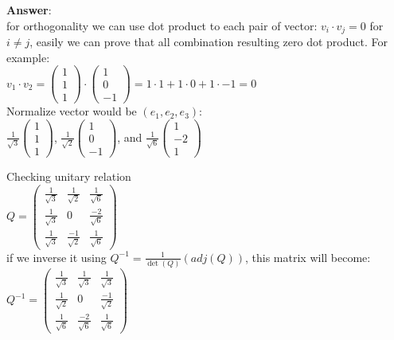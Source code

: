 \documentclass[paper=a4, fontsize=11pt]{scrartcl}
\numberwithin{equation}{section} %
\numberwithin{figure}{section} %
\numberwithin{table}{section} %
\begin{document}
\textbf{Answer}:\\
for orthogonality we can use dot product to each pair of vector:
$v_{i} \cdot v_{j} = 0$ for $i \neq j$, easily we can prove that all combination resulting zero dot product. For example:\\
$ v_1 \cdot v_2 = \begin{pmatrix} 1 \\ 1 \\ 1 \end{pmatrix} \cdot \begin{pmatrix} 1 \\ 0 \\ -1 \end{pmatrix} = 1\cdot 1 + 1 \cdot 0 + 1 \cdot -1 = 0 $\\

Normalize vector would be $(e_1, e_2, e_3)$:\\
$\frac{1}{\sqrt{3}} \begin{pmatrix} 1 \\ 1 \\ 1 \end{pmatrix}$, $\frac{1}{\sqrt{2}} \begin{pmatrix} 1 \\ 0 \\ -1 \end{pmatrix}$, and $\frac{1}{\sqrt{6}} \begin{pmatrix} 1 \\ -2 \\ 1 \end{pmatrix}$

Checking unitary relation\\
$Q = \begin{pmatrix} \frac{1}{\sqrt{3}} & \frac{1}{\sqrt{2}} & \frac{1}{\sqrt{6}} \\ 
\frac{1}{\sqrt{3}} & 0 & \frac{-2}{\sqrt{6}} \\
\frac{1}{\sqrt{3}} & \frac{-1}{\sqrt{2}} & \frac{1}{\sqrt{6}}
\end{pmatrix}$\\


if we inverse it using $Q^{-1} = \frac{1}{\det(Q)} (adj(Q))$, this matrix will become:\\


$Q^{-1} = 
\begin{pmatrix} 
\frac{1}{\sqrt{3}} & \frac{1}{\sqrt{3}} & \frac{1}{\sqrt{3}}\\ 
\frac{1}{\sqrt{2}} & 0 & \frac{-1}{\sqrt{2}} \\
\frac{1}{\sqrt{6}} & \frac{-2}{\sqrt{6}} & \frac{1}{\sqrt{6}}
\end{pmatrix}$\\
\end{document}
